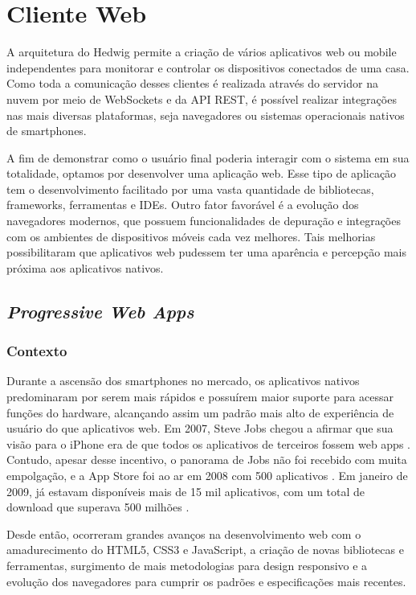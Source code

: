 \section{Cliente Web}
A arquitetura do Hedwig permite a criação de vários aplicativos web ou mobile independentes para monitorar e controlar os dispositivos conectados de uma casa. Como toda a comunicação desses clientes é realizada através do servidor na nuvem por meio de WebSockets e da API REST, é possível realizar integrações nas mais diversas plataformas, seja navegadores ou sistemas operacionais nativos de smartphones.

A fim de demonstrar como o usuário final poderia interagir com o sistema em sua totalidade, optamos por desenvolver uma aplicação web. Esse tipo de aplicação tem o desenvolvimento facilitado por uma vasta quantidade de bibliotecas, frameworks, ferramentas e IDEs. Outro fator favorável é a evolução dos navegadores modernos, que possuem funcionalidades de depuração e integrações com os ambientes de dispositivos móveis cada vez melhores. Tais melhorias possibilitaram que aplicativos web pudessem ter uma aparência e percepção mais próxima aos aplicativos nativos.

\subsection{\textit{Progressive Web Apps}}

\subsubsection{Contexto}
Durante a ascensão dos smartphones no mercado, os aplicativos nativos predominaram por serem mais rápidos e possuírem maior suporte para acessar funções do hardware, alcançando assim um padrão mais alto de experiência de usuário do que aplicativos web. Em 2007, Steve Jobs chegou a afirmar que sua visão para o iPhone era de que todos os aplicativos de terceiros fossem web apps \cite{9to5mac}. Contudo, apesar desse incentivo, o panorama de Jobs não foi recebido com muita empolgação, e a App Store foi ao ar em 2008 com 500 aplicativos \cite{ricker}. Em janeiro de 2009, já estavam disponíveis mais de 15 mil aplicativos, com um total de download que superava 500 milhões \cite{myslewski}.

Desde então, ocorreram grandes avanços na desenvolvimento web com o amadurecimento do HTML5, CSS3 e JavaScript, a criação de novas bibliotecas e ferramentas, surgimento de mais metodologias para design responsivo e a evolução dos navegadores para cumprir os padrões e especificações mais recentes.

